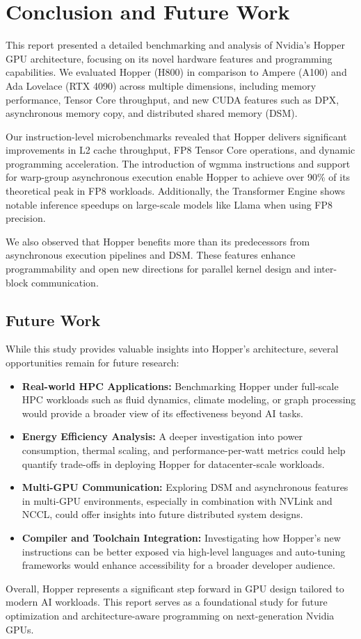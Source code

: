 \section{Conclusion and Future Work}

This report presented a detailed benchmarking and analysis of Nvidia's Hopper GPU\cite{luo2024hopper} architecture, focusing on its novel hardware features and programming capabilities. We evaluated Hopper (H800) in comparison to Ampere (A100) and Ada Lovelace (RTX 4090) across multiple dimensions, including memory performance, Tensor Core throughput, and new CUDA features such as DPX, asynchronous memory copy, and distributed shared memory (DSM).

Our instruction-level microbenchmarks revealed that Hopper delivers significant improvements in L2 cache throughput, FP8 Tensor Core operations, and dynamic programming acceleration. The introduction of wgmma instructions and support for warp-group asynchronous execution enable Hopper to achieve over 90\% of its theoretical peak in FP8 workloads. Additionally, the Transformer Engine shows notable inference speedups on large-scale models like Llama when using FP8 precision.

We also observed that Hopper benefits more than its predecessors from asynchronous execution pipelines and DSM. These features enhance programmability and open new directions for parallel kernel design and inter-block communication.

\subsection{Future Work}

While this study provides valuable insights into Hopper’s architecture, several opportunities remain for future research:

\begin{itemize}
    \item \textbf{Real-world HPC Applications:} Benchmarking Hopper under full-scale HPC workloads such as fluid dynamics, climate modeling, or graph processing would provide a broader view of its effectiveness beyond AI tasks.
    \item \textbf{Energy Efficiency Analysis:} A deeper investigation into power consumption, thermal scaling, and performance-per-watt metrics could help quantify trade-offs in deploying Hopper for datacenter-scale workloads.
    \item \textbf{Multi-GPU Communication:} Exploring DSM and asynchronous features in multi-GPU environments, especially in combination with NVLink and NCCL, could offer insights into future distributed system designs.
    \item \textbf{Compiler and Toolchain Integration:} Investigating how Hopper’s new instructions can be better exposed via high-level languages and auto-tuning frameworks would enhance accessibility for a broader developer audience.
\end{itemize}

Overall, Hopper represents a significant step forward in GPU design tailored to modern AI workloads. This report serves as a foundational study for future optimization and architecture-aware programming on next-generation Nvidia GPUs.
